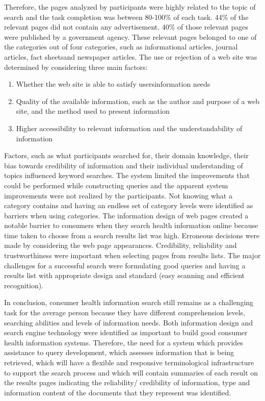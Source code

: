 \documentclass[]{article}
\begin{document}
\begin{enumerate}
Therefore, the pages analyzed by participants were highly related to the topic of search and the task completion was between 80-100\% of each task. 44\% of the relevant pages did not contain any advertisement. 40\% of those relevant pages were published by a government agency. These relevant pages belonged to one of the categories out of four categories, such as \textquotesingle informational articles\textquotesingle, \textquotesingle journal articles\textquotesingle, \textquotesingle fact sheets\textquotesingle and \textquotesingle newspaper articles\textquotesingle. The use or rejection of a web site was determined by considering three main factors:

\begin{enumerate}
	\item Whether the web site is able to satisfy users\textquotesingle information needs
	
	\item Quality of the available information, such as the author and purpose of a web site, and the method used to present information
	
	\item Higher accessibility to relevant information and the understandability of information   
\end{enumerate}

Factors, such as what participants searched for, their domain knowledge, their bias towards credibility of information and their individual understanding of topics influenced keyword searches. The system limited the improvements that could be performed while constructing queries and the apparent system improvements were not realized by the participants. Not knowing what a category contains and having an endless set of category levels were identified as barriers when using categories. The information design of web pages created a notable barrier to consumers when they search health information online because time taken to choose from a search results list was high. Erroneous decisions were made by considering the web page appearances. Credibility, reliability and trustworthiness were important when selecting pages from results lists. The major challenges for a successful search were formulating good queries and having a results list with appropriate design and standard (easy scanning and efficient recognition).  

In conclusion, consumer health information search still remains as a challenging task for the average person because they have different comprehension levels, searching abilities and levels of information needs. Both information design and search engine technology were identified as important to build good consumer health information systems. Therefore, the need for a system which provides assistance to query development, which assesses information that is being retrieved, which will have a flexible and responsive terminological infrastructure to support the search process and which will contain summaries of each result on the results pages indicating the reliability/ credibility of information, type and information content of the documents that they represent was identified. \\ 


\end{enumerate}
\end{document}
